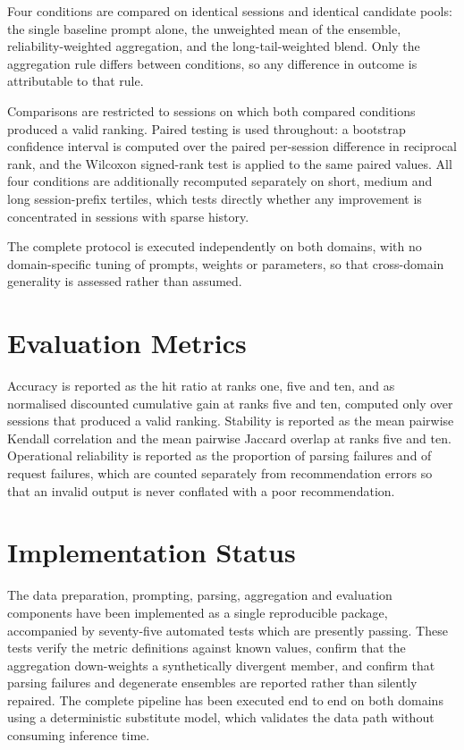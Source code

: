 \documentclass[12pt,a4paper,oneside]{report}
\begin{document}
Four conditions are compared on identical sessions and identical candidate
pools: the single baseline prompt alone, the unweighted mean of the ensemble,
reliability-weighted aggregation, and the long-tail-weighted blend. Only the
aggregation rule differs between conditions, so any difference in outcome is
attributable to that rule.

Comparisons are restricted to sessions on which both compared conditions
produced a valid ranking. Paired testing is used throughout: a bootstrap
confidence interval is computed over the paired per-session difference in
reciprocal rank, and the Wilcoxon signed-rank test is applied to the same paired
values. All four conditions are additionally recomputed separately on short,
medium and long session-prefix tertiles, which tests directly whether any
improvement is concentrated in sessions with sparse history.

The complete protocol is executed independently on both domains, with no
domain-specific tuning of prompts, weights or parameters, so that cross-domain
generality is assessed rather than assumed.

\section{Evaluation Metrics}

Accuracy is reported as the hit ratio at ranks one, five and ten, and as
normalised discounted cumulative gain at ranks five and ten, computed only over
sessions that produced a valid ranking. Stability is reported as the mean
pairwise Kendall correlation and the mean pairwise Jaccard overlap at ranks five
and ten. Operational reliability is reported as the proportion of parsing
failures and of request failures, which are counted separately from
recommendation errors so that an invalid output is never conflated with a poor
recommendation.

\section{Implementation Status}

The data preparation, prompting, parsing, aggregation and evaluation components
have been implemented as a single reproducible package, accompanied by
seventy-five automated tests which are presently passing. These tests verify the
metric definitions against known values, confirm that the aggregation
down-weights a synthetically divergent member, and confirm that parsing failures
and degenerate ensembles are reported rather than silently repaired. The complete
pipeline has been executed end to end on both domains using a deterministic
substitute model, which validates the data path without consuming inference time.
\end{document}
